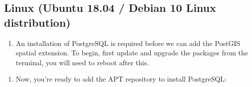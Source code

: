 \documentclass[a4paper,11pt,english]{sphinxmanual}
\begin{document}
\subsection{Linux (Ubuntu 18.04 / Debian 10 Linux distribution)}
\label{\detokenize{installation_linux:linux-ubuntu-18-04-debian-10-linux-distribution}}\label{\detokenize{installation_linux:installation-linux}}\label{\detokenize{installation_linux::doc}}\begin{enumerate}
\def\theenumi{\arabic{enumi}}
\def\labelenumi{\theenumi .}
\makeatletter\def\p@enumii{\p@enumi \theenumi .}\makeatother
\item {} 
An installation of PostgreSQL is required before we can add the PostGIS spatial extension. To begin, first update and upgrade the packages from the terminal, you will need to reboot after this.

\end{enumerate}
\begin{quote}

\begin{sphinxVerbatim}[commandchars=\\\{\}]
  
   
 
\end{sphinxVerbatim}
\end{quote}
\begin{enumerate}
\def\theenumi{\arabic{enumi}}
\def\labelenumi{\theenumi .}
\makeatletter\def\p@enumii{\p@enumi \theenumi .}\makeatother
\item {} 
Now, you’re ready to add the APT repository to install PostgreSQL:

\end{enumerate}
\begin{quote}

\begin{sphinxVerbatim}[commandchars=\\\{\}]
    
         
     
\end{sphinxVerbatim}
\end{quote}
\end{document}
